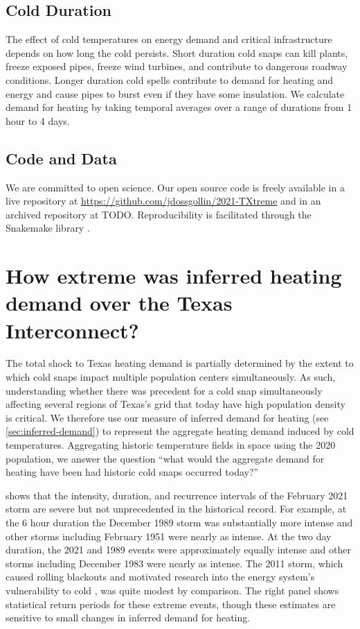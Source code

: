 \documentclass[12pt]{iopart}
\begin{document}
\subsection{Cold Duration}

The effect of cold temperatures on energy demand and critical infrastructure depends on how long the cold persists.
Short duration cold snaps can kill plants, freeze exposed pipes, freeze wind turbines, and contribute to dangerous roadway conditions.
Longer duration cold spells contribute to demand for heating and energy and cause pipes to burst even if they have some insulation.
We calculate demand for heating by taking temporal averages over a range of durations from 1 hour to 4 days.

\subsection{Code and Data}

We are committed to open science.
Our open source code is freely available in a live repository at \url{https://github.com/jdossgollin/2021-TXtreme} and in an archived repository at TODO.
Reproducibility is facilitated through the Snakemake library \cite{koster_snakemake:2012}.

\section{How extreme was inferred heating demand over the Texas Interconnect?}

The total shock to Texas heating demand is partially determined by the extent to which cold snaps impact multiple population centers simultaneously.
As such, understanding whether there was precedent for a cold snap simultaneously affecting several regions of Texas's grid that today have high population density is critical.
We therefore use our measure of inferred demand for heating (see \cref{sec:inferred-demand}) to represent the aggregate heating demand induced by cold temperatures.
Aggregating historic temperature fields in space using the 2020 population, we answer the question ``what would the aggregate demand for heating have been had historic cold snaps occurred today?''

 shows that the intensity, duration, and recurrence intervals of the February 2021 storm are severe but not unprecedented in the historical record.
For example, at the 6 hour duration the December 1989 storm was substantially more intense and other storms including February 1951 were nearly as intense.
At the two day duration, the 2021 and 1989 events were approximately equally intense and other storms including December 1983 were nearly as intense.
The 2011 storm, which caused rolling blackouts and motivated research into the energy system's vulnerability to cold \cite{ferc_outages:2011}, was quite modest by comparison.
The right panel shows statistical return periods for these extreme events, though these estimates are sensitive to small changes in inferred demand for heating.
\end{document}
